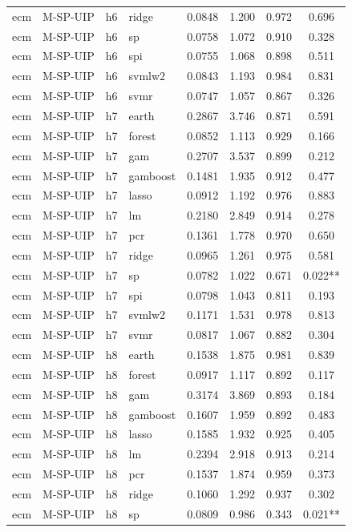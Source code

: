 \begin{ThreePartTable}
\begin{longtable}[t]{llclcccc}
ecm & M-SP-UIP & h6 & ridge & 0.0848 & 1.200 & 0.972 & 0.696\\
ecm & M-SP-UIP & h6 & sp & 0.0758 & 1.072 & 0.910 & 0.328\\
ecm & M-SP-UIP & h6 & spi & 0.0755 & 1.068 & 0.898 & 0.511\\
ecm & M-SP-UIP & h6 & svmlw2 & 0.0843 & 1.193 & 0.984 & 0.831\\
ecm & M-SP-UIP & h6 & svmr & 0.0747 & 1.057 & 0.867 & 0.326\\
\addlinespace
ecm & M-SP-UIP & h7 & earth & 0.2867 & 3.746 & 0.871 & 0.591\\
ecm & M-SP-UIP & h7 & forest & 0.0852 & 1.113 & 0.929 & 0.166\\
ecm & M-SP-UIP & h7 & gam & 0.2707 & 3.537 & 0.899 & 0.212\\
ecm & M-SP-UIP & h7 & gamboost & 0.1481 & 1.935 & 0.912 & 0.477\\
ecm & M-SP-UIP & h7 & lasso & 0.0912 & 1.192 & 0.976 & 0.883\\
ecm & M-SP-UIP & h7 & lm & 0.2180 & 2.849 & 0.914 & 0.278\\
ecm & M-SP-UIP & h7 & pcr & 0.1361 & 1.778 & 0.970 & 0.650\\
ecm & M-SP-UIP & h7 & ridge & 0.0965 & 1.261 & 0.975 & 0.581\\
ecm & M-SP-UIP & h7 & sp & 0.0782 & 1.022 & 0.671 & 0.022**\\
ecm & M-SP-UIP & h7 & spi & 0.0798 & 1.043 & 0.811 & 0.193\\
ecm & M-SP-UIP & h7 & svmlw2 & 0.1171 & 1.531 & 0.978 & 0.813\\
ecm & M-SP-UIP & h7 & svmr & 0.0817 & 1.067 & 0.882 & 0.304\\
\addlinespace
ecm & M-SP-UIP & h8 & earth & 0.1538 & 1.875 & 0.981 & 0.839\\
ecm & M-SP-UIP & h8 & forest & 0.0917 & 1.117 & 0.892 & 0.117\\
ecm & M-SP-UIP & h8 & gam & 0.3174 & 3.869 & 0.893 & 0.184\\
ecm & M-SP-UIP & h8 & gamboost & 0.1607 & 1.959 & 0.892 & 0.483\\
ecm & M-SP-UIP & h8 & lasso & 0.1585 & 1.932 & 0.925 & 0.405\\
ecm & M-SP-UIP & h8 & lm & 0.2394 & 2.918 & 0.913 & 0.214\\
ecm & M-SP-UIP & h8 & pcr & 0.1537 & 1.874 & 0.959 & 0.373\\
ecm & M-SP-UIP & h8 & ridge & 0.1060 & 1.292 & 0.937 & 0.302\\
ecm & M-SP-UIP & h8 & sp & 0.0809 & 0.986 & 0.343 & 0.021**\\

\end{longtable}
\end{ThreePartTable}
